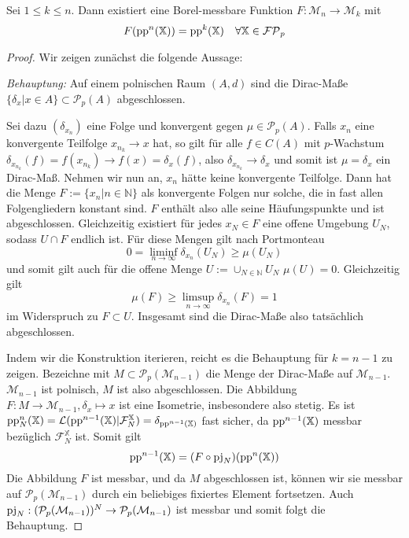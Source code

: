     \begin{lemma}\label{thm:stepback_pp} %
        Sei $1\leq k\leq n$. Dann existiert eine Borel-messbare Funktion $F:\mathcal{M}_n\rightarrow \mathcal{M}_k$ mit 
        $$F(\operatorname{pp}^n(\mathbb{X})) = \operatorname{pp}^k(\mathbb{X}) \quad \forall \mathbb{X} \in \mathcal{FP}_p$$
    \end{lemma}
    \begin{proof}
        Wir zeigen zunächst die folgende Aussage:

        \emph{Behauptung:} Auf einem polnischen Raum $(A, d)$ sind die Dirac-Maße $\{\delta_x \vert x\in A\} \subset \mathcal{P}_p(A)$ abgeschlossen.

        Sei dazu $\left(\delta_{x_n}\right)$ eine Folge und konvergent gegen $\mu \in \mathcal{P}_p(A)$. Falls $x_n$ eine konvergente Teilfolge $x_{n_k} \rightarrow x$ hat, so gilt für alle $f \in C(A)$ mit $p$-Wachstum $\delta_{x_{n_k}}(f)=f(x_{n_k})\rightarrow f(x)=\delta_x(f)$, also $\delta_{x_{n_k}}\rightarrow \delta_x$ und somit ist $\mu = \delta_x$ ein Dirac-Maß. Nehmen wir nun an, $x_n$ hätte keine konvergente Teilfolge. Dann hat die Menge $F:=\{x_n \vert n \in \mathbb{N}\}$ als konvergente Folgen nur solche, die in fast allen Folgengliedern konstant sind. $F$ enthält also alle seine Häufungspunkte und ist abgeschlossen. Gleichzeitig existiert für jedes $x_N \in F$ eine offene Umgebung $U_N$, sodass $U\cap F$ endlich ist. Für diese Mengen gilt nach Portmonteau
        $$0 = \liminf_{n\rightarrow \infty} \delta_{x_n}(U_N) \geq \mu(U_N)$$
        und somit gilt auch für die offene Menge $U:=\cup_{N\in\mathbb{N}} U_N$ $\mu(U)=0$. Gleichzeitig gilt
        $$\mu(F) \geq \limsup_{n\rightarrow \infty} \delta_{x_n}(F)=1$$
        im Widerspruch zu $F \subset U$. Insgesamt sind die Dirac-Maße also tatsächlich abgeschlossen.

        Indem wir die Konstruktion iterieren, reicht es die Behauptung für $k=n-1$ zu zeigen. Bezeichne mit $M\subset \mathcal{P}_p(\mathcal{M}_{n-1})$ die Menge der Dirac-Maße auf $\mathcal{M}_{n-1}$. $\mathcal{M}_{n-1}$ ist polnisch, $M$ ist also abgeschlossen. Die Abbildung $F: M \rightarrow \mathcal{M}_{n-1}, \delta_x \mapsto x$ ist eine Isometrie, insbesondere also stetig. Es ist $\operatorname{pp}^n_N(\mathbb{X}) = \mathcal{L}(\operatorname{pp}^{n-1}(\mathbb{X})\vert \mathcal{F}_N^\mathbb{X}) = \delta_{\operatorname{pp}^{n-1}(\mathbb{X})}$ fast sicher, da $\operatorname{pp}^{n-1}(\mathbb{X})$ messbar bezüglich $\mathcal{F}_N^{\mathbb{X}}$ ist. Somit gilt 
        $$\operatorname{pp}^{n-1}(\mathbb{X}) = (F\circ \operatorname{pj}_N)(\operatorname{pp}^n(\mathbb{X}))$$
        Die Abbildung $F$ ist messbar, und da $M$ abgeschlossen ist, können wir sie messbar auf $\mathcal{P}_p(\mathcal{M}_{n-1})$ durch ein beliebiges fixiertes Element fortsetzen. Auch $\operatorname{pj}_N:(\mathcal{P}_p(\mathcal{M}_{n-1}))^N \rightarrow \mathcal{P}_p(\mathcal{M}_{n-1})$ ist messbar und somit folgt die Behauptung.
    \end{proof}

